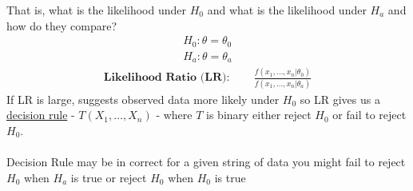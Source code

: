 That is, what is the likelihood under $H_0$ and what is the likelihood under $H_a$ and how do they compare?
\begin{gather*}
	H_0: \theta = \theta_0\\
		H_a: \theta = \theta_a
\end{gather*}
\begin{gather*}
	\textbf{Likelihood Ratio (LR)}: \qquad \frac{f(x_1, \ldots, x_n | \theta_0)}{f(x_1, \ldots, x_n | \theta_a)}
\end{gather*}
If LR is large, suggests observed data more likely under $H_0$ so LR gives us a \underline{decision rule} - $T(X_1, \ldots, X_n)$ - where $T$ is binary either reject $H_0$ or fail to reject $H_0$.\\\\
Decision Rule may be in correct for a given string of data you might fail to reject $H_0$ when $H_a$ is true or reject $H_0$ when $H_0$ is true
